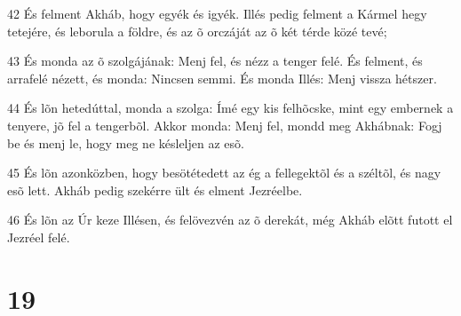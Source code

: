 \par 42 És felment Akháb, hogy egyék és igyék. Illés pedig felment a Kármel hegy tetejére, és leborula a földre, és az õ orczáját az õ két térde közé tevé;
\par 43 És monda az õ szolgájának: Menj fel, és nézz a tenger felé. És felment, és arrafelé nézett, és monda: Nincsen semmi. És monda Illés: Menj vissza hétszer.
\par 44 És lõn hetedúttal, monda a szolga: Ímé egy kis felhõcske, mint egy embernek a tenyere, jõ fel a tengerbõl. Akkor monda: Menj fel, mondd meg Akhábnak: Fogj be és menj le, hogy meg ne késleljen az esõ.
\par 45 És lõn azonközben, hogy besötétedett az ég a fellegektõl és a széltõl, és nagy esõ lett. Akháb pedig szekérre ült és elment Jezréelbe.
\par 46 És lõn az Úr keze Illésen, és felövezvén az õ derekát, még Akháb elõtt futott el Jezréel felé.

\chapter{19}

